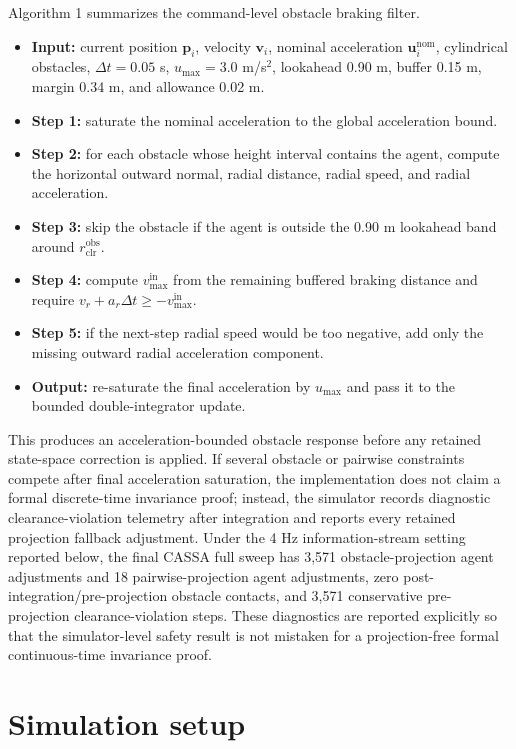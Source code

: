 \documentclass[11pt]{article}
\begin{document}
Algorithm 1 summarizes the command-level obstacle braking filter.
\begin{itemize}
    \item \textbf{Input:} current position $\mathbf{p}_i$, velocity $\mathbf{v}_i$, nominal acceleration $\mathbf{u}^{\mathrm{nom}}_i$, cylindrical obstacles, $\Delta t=0.05$ s, $u_{\max}=3.0$ m/s$^2$, lookahead 0.90 m, buffer 0.15 m, margin 0.34 m, and allowance 0.02 m.
    \item \textbf{Step 1:} saturate the nominal acceleration to the global acceleration bound.
    \item \textbf{Step 2:} for each obstacle whose height interval contains the agent, compute the horizontal outward normal, radial distance, radial speed, and radial acceleration.
    \item \textbf{Step 3:} skip the obstacle if the agent is outside the 0.90 m lookahead band around $r^{\mathrm{obs}}_{\mathrm{clr}}$.
    \item \textbf{Step 4:} compute $v^{\mathrm{in}}_{\max}$ from the remaining buffered braking distance and require $v_r+a_r\Delta t\geq -v^{\mathrm{in}}_{\max}$.
    \item \textbf{Step 5:} if the next-step radial speed would be too negative, add only the missing outward radial acceleration component.
    \item \textbf{Output:} re-saturate the final acceleration by $u_{\max}$ and pass it to the bounded double-integrator update.
\end{itemize}
This produces an acceleration-bounded obstacle response before any retained state-space correction is applied. If several obstacle or pairwise constraints compete after final acceleration saturation, the implementation does not claim a formal discrete-time invariance proof; instead, the simulator records diagnostic clearance-violation telemetry after integration and reports every retained projection fallback adjustment. Under the 4 Hz information-stream setting reported below, the final CASSA full sweep has 3,571 obstacle-projection agent adjustments and 18 pairwise-projection agent adjustments, zero post-integration/pre-projection obstacle contacts, and 3,571 conservative pre-projection clearance-violation steps. These diagnostics are reported explicitly so that the simulator-level safety result is not mistaken for a projection-free formal continuous-time invariance proof.

\section{Simulation setup}
\end{document}
